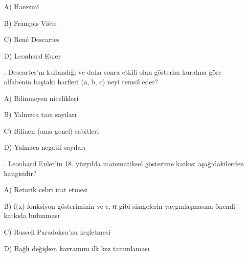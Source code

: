 \par\noindent\hspace*{1.6em}A) Harezmî

\par\noindent\hspace*{1.6em}B) François Viète

\par\noindent\hspace*{1.6em}C) René Descartes

\par\noindent\hspace*{1.6em}D) Leonhard Euler

\par\smallskip{}. Descartes’ın kullandığı ve daha sonra etkili olan gösterim kuralına göre alfabenin baştaki harfleri (a, b, c) neyi temsil eder?

\par\noindent\hspace*{1.6em}A) Bilinmeyen nicelikleri

\par\noindent\hspace*{1.6em}B) Yalnızca tam sayıları

\par\noindent\hspace*{1.6em}C) Bilinen (ama genel) sabitleri

\par\noindent\hspace*{1.6em}D) Yalnızca negatif sayıları

\par\smallskip{}. Leonhard Euler’in 18. yüzyılda matematiksel gösterime katkısı aşağıdakilerden hangisidir?

\par\noindent\hspace*{1.6em}A) Retorik cebri icat etmesi

\par\noindent\hspace*{1.6em}B) f(x) fonksiyon gösteriminin ve e, 𝜋 gibi simgelerin yaygınlaşmasına önemli katkıda bulunması

\par\noindent\hspace*{1.6em}C) Russell Paradoksu’nu keşfetmesi

\par\noindent\hspace*{1.6em}D) Bağlı değişken kavramını ilk kez tanımlaması


